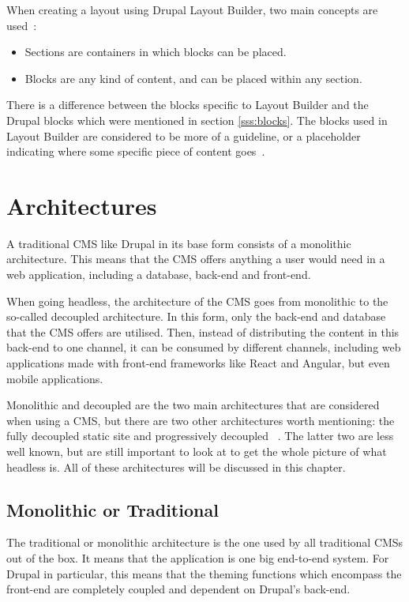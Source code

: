 When creating a layout using Drupal Layout Builder, two main concepts are used~\autocite{Drupalize2022}: 
\begin{itemize}
	\item  Sections are containers in which blocks can be placed.
	\item  Blocks are any kind of content, and can be placed within any section.
\end{itemize}
There is a difference between the blocks specific to Layout Builder and the Drupal blocks which were mentioned in section \ref{sss:blocks}. The blocks used in Layout Builder are considered to be more of a guideline, or a placeholder indicating where some specific piece of content goes~\autocite{Drupalize2022}.





\section{Architectures}
A traditional CMS like Drupal in its base form consists of a monolithic architecture. This means that the CMS offers anything a user would need in a web application, including a database, back-end and front-end.

When going headless, the architecture of the CMS goes from monolithic to the so-called decoupled architecture. In this form, only the back-end and database that the CMS offers are utilised. Then, instead of distributing the content in this back-end to one channel, it can be consumed by different channels, including web applications made with front-end frameworks like React and Angular, but even mobile applications.

Monolithic and decoupled are the two main architectures that are considered when using a CMS, but there are two other architectures worth mentioning: the fully decoupled static site and progressively decoupled ~\autocite{Dropsolid2021}. The latter two are less well known, but are still important to look at to get the whole picture of what headless is. All of these architectures will be discussed in this chapter.


\subsection{Monolithic or Traditional}
The traditional or monolithic architecture is the one used by all traditional CMSs out of the box. It means that the application is one big end-to-end system. For Drupal in particular, this means that the theming functions which encompass the front-end are completely coupled and dependent on Drupal's back-end.

